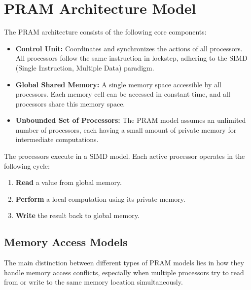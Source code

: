 \documentclass[12pt]{book}
\begin{document}
\section{PRAM Architecture Model}

The PRAM architecture consists of the following core components:

\begin{itemize}
    \item \textbf{Control Unit:} Coordinates and synchronizes the actions of all processors. All processors follow the same instruction in lockstep, adhering to the SIMD (Single Instruction, Multiple Data) paradigm.
    
    \item \textbf{Global Shared Memory:} A single memory space accessible by all processors. Each memory cell can be accessed in constant time, and all processors share this memory space.
    
    \item \textbf{Unbounded Set of Processors:} The PRAM model assumes an unlimited number of processors, each having a small amount of private memory for intermediate computations.
\end{itemize}

The processors execute in a SIMD model. Each active processor operates in the following cycle:
\begin{enumerate}
    \item \textbf{Read} a value from global memory.
    \item \textbf{Perform} a local computation using its private memory.
    \item \textbf{Write} the result back to global memory.
\end{enumerate}

\subsection{Memory Access Models}
The main distinction between different types of PRAM models lies in how they handle memory access conflicts, especially when multiple processors try to read from or write to the same memory location simultaneously.
\end{document}
